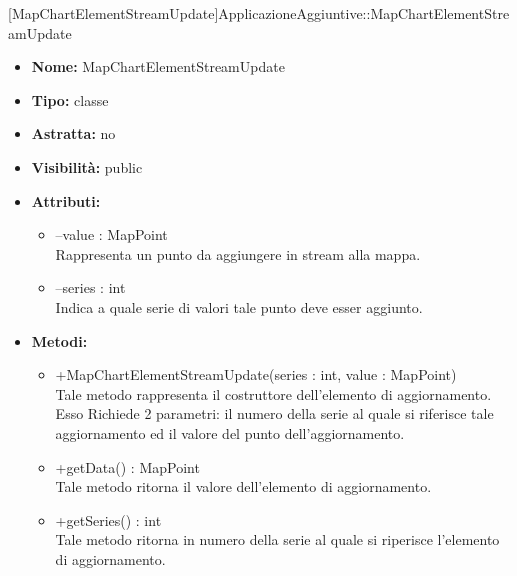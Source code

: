 			[MapChartElementStreamUpdate]{ApplicazioneAggiuntive::MapChartElementStreamUpdate}
			

	
			
			\begin{itemize}
			\item \textbf{Nome:} MapChartElementStreamUpdate
			\item \textbf{Tipo:} classe
			
		\item \textbf{Astratta:}
		no
			\item \textbf{Visibilità:} public
			\item \textbf{Attributi:}
				\begin{itemize}
				\setlength{\itemsep}{5pt}
				
					\item[\ding{111}] {--value : MapPoint} \\ [1mm] Rappresenta un punto da aggiungere in stream alla mappa.
					\item[\ding{111}] {--series : int} \\ [1mm] Indica a quale serie di valori tale punto deve esser aggiunto.
				\end{itemize}
		
			\item \textbf{Metodi:}
				\begin{itemize}
				\setlength{\itemsep}{5pt}
				
					\item[\ding{111}] {{+MapChartElementStreamUpdate(series : int, value : MapPoint)}} \\ [1mm] Tale metodo rappresenta il costruttore dell'elemento di aggiornamento. Esso Richiede 2 parametri: il numero della serie al quale si riferisce tale aggiornamento ed il valore del punto dell'aggiornamento.
					\item[\ding{111}] {{+getData() : MapPoint}} \\ [1mm] Tale metodo ritorna il valore dell'elemento di aggiornamento.
					\item[\ding{111}] {{+getSeries() : int}} \\ [1mm] Tale metodo ritorna in numero della serie al quale si riperisce l'elemento di aggiornamento.
				\end{itemize}
		
			\end{itemize}
	

